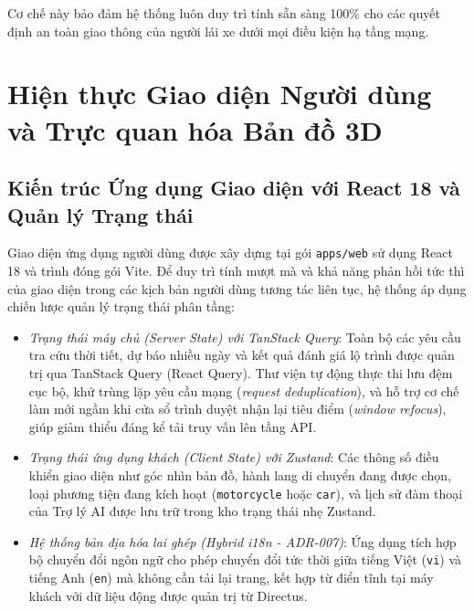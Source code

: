 Cơ chế này bảo đảm hệ thống luôn duy trì tính sẵn sàng 100\% cho các quyết định an toàn giao thông của người lái xe dưới mọi điều kiện hạ tầng mạng.

\section{Hiện thực Giao diện Người dùng và Trực quan hóa Bản đồ 3D}
\label{sec:frontend_web_impl}

\subsection{Kiến trúc Ứng dụng Giao diện với React 18 và Quản lý Trạng thái}
Giao diện ứng dụng người dùng được xây dựng tại gói \texttt{apps/web} sử dụng React 18 và trình đóng gói Vite. Để duy trì tính mượt mà và khả năng phản hồi tức thì của giao diện trong các kịch bản người dùng tương tác liên tục, hệ thống áp dụng chiến lược quản lý trạng thái phân tầng:
\begin{itemize}
    \item[-] \textit{Trạng thái máy chủ (Server State) với TanStack Query}: Toàn bộ các yêu cầu tra cứu thời tiết, dự báo nhiều ngày và kết quả đánh giá lộ trình được quản trị qua TanStack Query (React Query). Thư viện tự động thực thi lưu đệm cục bộ, khử trùng lặp yêu cầu mạng (\textit{request deduplication}), và hỗ trợ cơ chế làm mới ngầm khi cửa sổ trình duyệt nhận lại tiêu điểm (\textit{window refocus}), giúp giảm thiểu đáng kể tải truy vấn lên tầng API.
    \item[-] \textit{Trạng thái ứng dụng khách (Client State) với Zustand}: Các thông số điều khiển giao diện như góc nhìn bản đồ, hành lang di chuyển đang được chọn, loại phương tiện đang kích hoạt (\texttt{motorcycle} hoặc \texttt{car}), và lịch sử đàm thoại của Trợ lý AI được lưu trữ trong kho trạng thái nhẹ Zustand.
    \item[-] \textit{Hệ thống bản địa hóa lai ghép (Hybrid i18n - ADR-007)}: Ứng dụng tích hợp bộ chuyển đổi ngôn ngữ cho phép chuyển đổi tức thời giữa tiếng Việt (\texttt{vi}) và tiếng Anh (\texttt{en}) mà không cần tải lại trang, kết hợp từ điển tĩnh tại máy khách với dữ liệu động được quản trị từ Directus.
\end{itemize}

